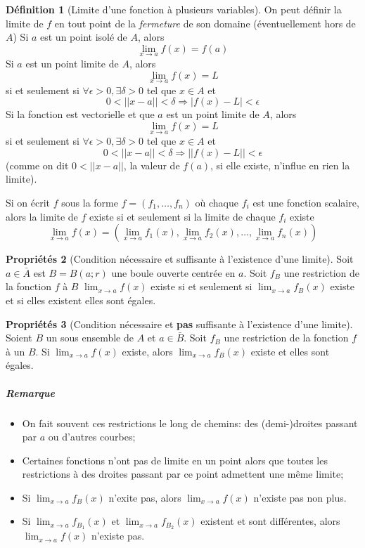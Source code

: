 \documentclass[11pt,a4paper]{article}
\theoremstyle{definition}
\newtheorem{mydef}{Définition}%
\newtheorem{myprop}[mydef]{Propriétés}
\begin{document}
\begin{mydef}[Limite d'une fonction à plusieurs variables]
	On peut définir la limite de $f$ en tout point de la \emph{fermeture} de son domaine (éventuellement hors de $A$)
	Si $a$ est un point isolé de $A$, alors
	\[ \lim_{x \to a} f(x) = f(a) \]
	Si $a$ est un point limite de $A$, alors
	\[ \lim_{x \to a} f(x) = L \]
	si et seulement si $\forall \epsilon >0, \exists \delta > 0$ tel que $x \in A$ et
	\[ 0 < || x - a || < \delta \Rightarrow |f(x) - L| < \epsilon \]
	Si la fonction est vectorielle et que $a$ est un point limite de $A$, alors
	\[ \lim_{x \to a} f(x) = L \]
	si et seulement si $\forall \epsilon >0, \exists \delta > 0$ tel que $x \in A$ et
	\[ 0 < || x - a || < \delta \Rightarrow ||f(x) - L|| < \epsilon \]
	(comme on dit $0 < ||x - a||$, la valeur de $f(a)$, si elle existe, n'influe en rien la limite).

	Si on écrit $f$ sous la forme $f = (f_1 , \dots , f_n)$ où chaque $f_i$ est une fonction scalaire, alors la limite de $f$ existe si et seulement si la limite de chaque $f_i$ existe
	\[ \lim_{x \to a} f(x) = \left( \lim_{x \to a} f_1(x), \lim_{x \to a} f_2(x), \dots , \lim_{x \to a} f_n(x) \right) \]
\end{mydef}

\begin{myprop}[Condition nécessaire et suffisante à l'existence d'une limite]
	Soit $a \in \bar{A}$ est $B = B(a; r)$ une boule ouverte centrée en $a$.
	Soit $f_B$ une restriction de la fonction $f$ à $B$
	\( \lim_{x \to a}f(x) \)
	existe si et seulement si
	\( \lim_{x \to a}f_B(x) \)
	existe et si elles existent elles sont égales.
\end{myprop}

\begin{myprop}[Condition nécessaire et \textbf{pas} suffisante à l'existence d'une limite]
	\label{prop:path}
	Soient $B$ un sous ensemble de $A$ et $a \in \bar{B}$.
	Soit $f_B$ une restriction de la fonction $f$ à un $B$.
	Si
	\( \lim_{x \to a}f(x) \)
	existe, alors
	\( \lim_{x \to a}f_B(x) \)
	existe et elles sont égales.
	\subparagraph{Remarque}
	\begin{itemize}
		\item On fait souvent ces restrictions le long de chemins: des (demi-)droites passant par $a$ ou d'autres courbes;
		\item Certaines fonctions n'ont pas de limite en un point alors que toutes les restrictions à des droites passant par
			ce point admettent une même limite;
		\item Si $\lim_{x \to a}f_B(x)$ n'exite pas, alors $\lim_{x \to a} f(x)$ n'existe pas non plus.
		\item Si $\lim_{x \to a}f_{B_1}(x)$ et $\lim_{x \to a}f_{B_2}(x)$ existent et sont différentes, alors
			$\lim_{x \to a} f(x)$ n'existe pas.
	\end{itemize}
\end{myprop}
\end{document}
